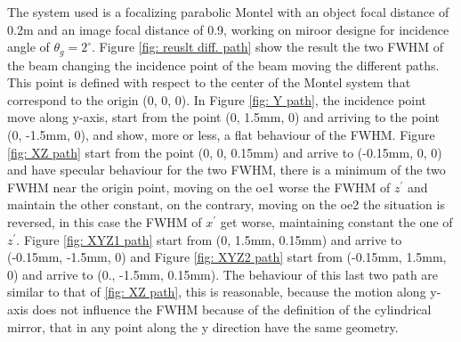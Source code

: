 The system used is a focalizing parabolic Montel with an object focal distance of 0.2m and an image focal distance of 0.9, working on miroor designe for incidence angle of $\theta_g = 2^{\circ}$. Figure \ref{fig: reuslt diff. path} show the result the two FWHM of the beam changing the incidence point of the beam moving the different paths. This point is defined with respect to the center of the Montel system that correspond to the origin (0, 0, 0). In Figure \ref{fig: Y path}, the incidence point move along y-axis, start from the point (0, 1.5mm, 0) and arriving to the point (0, -1.5mm, 0), and show, more or less, a flat behaviour of the FWHM. Figure \ref{fig: XZ path} start from the point (0, 0, 0.15mm) and arrive to (-0.15mm, 0, 0) and have specular behaviour for the two FWHM, there is a minimum of the two FWHM near the origin point, moving on the oe1 worse the FWHM of $z^{'} $ and maintain the other constant, on the contrary, moving on the oe2 the situation is reversed, in this case the FWHM of $x^{'} $ get worse, maintaining constant the one of $z^{'} $. Figure \ref{fig: XYZ1 path} start from (0, 1.5mm, 0.15mm) and arrive to (-0.15mm, -1.5mm, 0) and Figure \ref{fig: XYZ2 path} start from (-0.15mm, 1.5mm, 0) and arrive to (0., -1.5mm, 0.15mm). The behaviour of this last two path are similar to that of \ref{fig: XZ path}, this is reasonable, because the motion along y-axis does not influence the FWHM because of the definition of the cylindrical mirror, that in any point along the y direction have the same geometry.
\\
%
%
